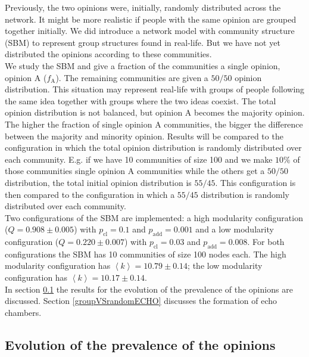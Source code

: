 \documentclass[11 pt , letterpaper , twoside , openright]{book}
\begin{document}
Previously, the two opinions were, initially, randomly distributed across the network. It might be more realistic if people with the same opinion are grouped together initially. We did introduce a network model with community structure (SBM) to represent group structures found in real-life. But we have not yet distributed the opinions according to these communities. \\
\newline
We study the SBM and give a fraction of the communities a single opinion, opinion A ($f_\text{A}$). The remaining communities are given a $50/50$ opinion distribution. This situation may represent real-life with groups of people following the same idea together with groups where the two ideas coexist. The total opinion distribution is not balanced, but opinion A becomes the majority opinion. The higher the fraction of single opinion A communities, the bigger the difference between the majority and minority opinion. Results will be compared to the configuration in which the total opinion distribution is randomly distributed over each community. E.g. if we have 10 communities of size 100 and we make $10 \%$ of those communities single opinion A communities while the others get a $50/50$ distribution, the total initial opinion distribution is $55/45$. This configuration is then compared to the configuration in which a $55/45$ distribution is randomly distributed over each community.\\ 
\newline
Two configurations of the SBM are implemented: a high modularity configuration ($Q = 0.908 \pm 0.005$) with $p_{\text{cl}} = 0.1$ and $p_{\text{add}} = 0.001$ and a low modularity configuration ($Q = 0.220 \pm 0.007$) with $p_{\text{cl}} = 0.03$ and $p_{\text{add}} = 0.008$. For both configurations the SBM has 10 communities of size 100 nodes each. The high modularity configuration has $\left<k\right> = 10.79 \pm 0.14$; the low modularity configuration has $\left<k\right> = 10.17 \pm 0.14$.\\
\newline
In section \ref{groupVSrandomOP} the results for the evolution of the prevalence of the opinions are discussed. Section \ref{groupVSrandomECHO} discusses the formation of echo chambers.
\newpage
\subsection{Evolution of the prevalence of the opinions}\label{groupVSrandomOP}
\end{document}
